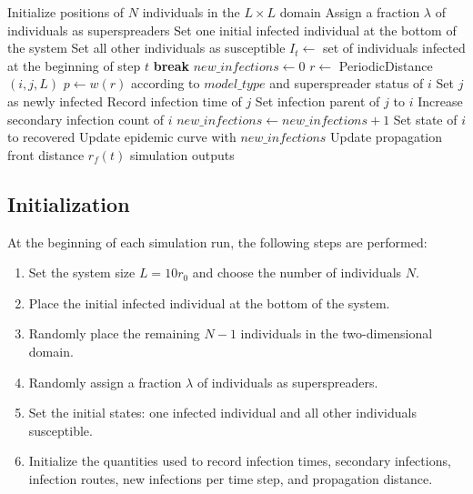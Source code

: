 \documentclass[11pt,a4paper]{article}
\begin{document}
\begin{algorithm}[t]
\footnotesize
\caption{Monte Carlo Simulation for Spatial SIR Model with Superspreaders}
\begin{algorithmic}[1]
    \State Initialize positions of $N$ individuals in the $L \times L$ domain
    \State Assign a fraction $\lambda$ of individuals as superspreaders
    \State Set one initial infected individual at the bottom of the system
    \State Set all other individuals as susceptible
        \State $I_t \gets$ set of individuals infected at the beginning of step $t$
            \State \textbf{break}
        \EndIf
        \State $new\_infections \gets 0$
                \State $r \gets$ PeriodicDistance$(i,j,L)$
                \State $p \gets w(r)$ according to $model\_type$ and superspreader status of $i$
                    \State Set $j$ as newly infected
                    \State Record infection time of $j$
                    \State Set infection parent of $j$ to $i$
                    \State Increase secondary infection count of $i$
                    \State $new\_infections \gets new\_infections + 1$
                \EndIf
            \EndFor
        \EndFor
                \State Set state of $i$ to recovered
            \EndIf
        \EndFor
        \State Update epidemic curve with $new\_infections$
        \State Update propagation front distance $r_f(t)$
    \EndFor
    \State \Return simulation outputs
\EndProcedure
\end{algorithmic}
\end{algorithm}

\subsection{Initialization}

At the beginning of each simulation run, the following steps are performed:

\begin{enumerate}[leftmargin=2em]
    \item Set the system size $L=10r_0$ and choose the number of individuals $N$.
    \item Place the initial infected individual at the bottom of the system.
    \item Randomly place the remaining $N-1$ individuals in the two-dimensional domain.
    \item Randomly assign a fraction $\lambda$ of individuals as superspreaders.
    \item Set the initial states: one infected individual and all other individuals susceptible.
    \item Initialize the quantities used to record infection times, secondary infections, infection routes, new infections per time step, and propagation distance.
\end{enumerate}
\end{document}
